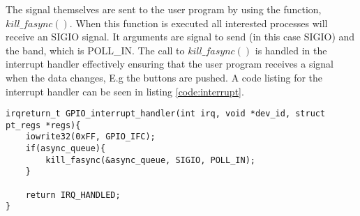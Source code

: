 The signal themselves are sent to the user program by using the function, $kill\_fasync()$. When this function is executed all interested processes will receive an SIGIO signal. It arguments are signal to send (in this case SIGIO) and the band, which is POLL\_IN. The call to $kill\_fasync()$ is handled in the interrupt handler effectively ensuring that the user program receives a signal when the data changes, E.g the buttons are pushed. A code listing for the interrupt handler can be seen in listing \ref{code:interrupt}.


\begin{lstlisting}[caption=Interrupt handler, label=code:interrupt]
irqreturn_t GPIO_interrupt_handler(int irq, void *dev_id, struct pt_regs *regs){
    iowrite32(0xFF, GPIO_IFC);
    if(async_queue){
        kill_fasync(&async_queue, SIGIO, POLL_IN);
    }
    
    return IRQ_HANDLED;
}
\end{lstlisting}




 









